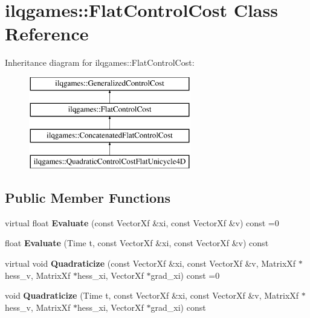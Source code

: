 \hypertarget{classilqgames_1_1_flat_control_cost}{}\section{ilqgames\+:\+:Flat\+Control\+Cost Class Reference}
\label{classilqgames_1_1_flat_control_cost}
Inheritance diagram for ilqgames\+:\+:Flat\+Control\+Cost\+:\begin{figure}[H]
\begin{center}
\leavevmode
\includegraphics[height=4.000000cm]{classilqgames_1_1_flat_control_cost}
\end{center}
\end{figure}
\subsection*{Public Member Functions}
\begin{DoxyCompactItemize}
\item 
virtual float {\bfseries Evaluate} (const Vector\+Xf \&xi, const Vector\+Xf \&v) const =0\hypertarget{classilqgames_1_1_flat_control_cost_a47542a27e7e6a346e79d9744f02e2991}{}\label{classilqgames_1_1_flat_control_cost_a47542a27e7e6a346e79d9744f02e2991}

\item 
float {\bfseries Evaluate} (Time t, const Vector\+Xf \&xi, const Vector\+Xf \&v) const \hypertarget{classilqgames_1_1_flat_control_cost_ae892791a5c58b169469baeadbdf66fe3}{}\label{classilqgames_1_1_flat_control_cost_ae892791a5c58b169469baeadbdf66fe3}

\item 
virtual void {\bfseries Quadraticize} (const Vector\+Xf \&xi, const Vector\+Xf \&v, Matrix\+Xf $\ast$hess\+\_\+v, Matrix\+Xf $\ast$hess\+\_\+xi, Vector\+Xf $\ast$grad\+\_\+xi) const =0\hypertarget{classilqgames_1_1_flat_control_cost_a6168e0177e7de6d737a0d8db35cfd766}{}\label{classilqgames_1_1_flat_control_cost_a6168e0177e7de6d737a0d8db35cfd766}

\item 
void {\bfseries Quadraticize} (Time t, const Vector\+Xf \&xi, const Vector\+Xf \&v, Matrix\+Xf $\ast$hess\+\_\+v, Matrix\+Xf $\ast$hess\+\_\+xi, Vector\+Xf $\ast$grad\+\_\+xi) const \hypertarget{classilqgames_1_1_flat_control_cost_a91e0b6460b82aa7b2c83fe29d1f6c7cd}{}\label{classilqgames_1_1_flat_control_cost_a91e0b6460b82aa7b2c83fe29d1f6c7cd}

\end{DoxyCompactItemize}
